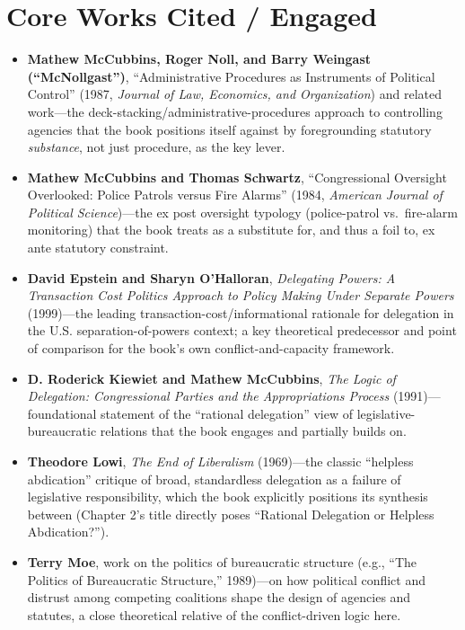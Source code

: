 \documentclass[12pt]{article}
\begin{document}
\section{Core Works Cited / Engaged}

\begin{itemize}[leftmargin=*, itemsep=4pt]
    \item \textbf{Mathew McCubbins, Roger Noll, and Barry Weingast (``McNollgast'')}, ``Administrative Procedures as Instruments of Political Control'' (1987, \textit{Journal of Law, Economics, and Organization}) and related work---the deck-stacking/administrative-procedures approach to controlling agencies that the book positions itself against by foregrounding statutory \emph{substance}, not just procedure, as the key lever.
    \item \textbf{Mathew McCubbins and Thomas Schwartz}, ``Congressional Oversight Overlooked: Police Patrols versus Fire Alarms'' (1984, \textit{American Journal of Political Science})---the ex post oversight typology (police-patrol vs.\ fire-alarm monitoring) that the book treats as a substitute for, and thus a foil to, ex ante statutory constraint.
    \item \textbf{David Epstein and Sharyn O'Halloran}, \textit{Delegating Powers: A Transaction Cost Politics Approach to Policy Making Under Separate Powers} (1999)---the leading transaction-cost/informational rationale for delegation in the U.S. separation-of-powers context; a key theoretical predecessor and point of comparison for the book's own conflict-and-capacity framework.
    \item \textbf{D. Roderick Kiewiet and Mathew McCubbins}, \textit{The Logic of Delegation: Congressional Parties and the Appropriations Process} (1991)---foundational statement of the ``rational delegation'' view of legislative-bureaucratic relations that the book engages and partially builds on.
    \item \textbf{Theodore Lowi}, \textit{The End of Liberalism} (1969)---the classic ``helpless abdication'' critique of broad, standardless delegation as a failure of legislative responsibility, which the book explicitly positions its synthesis between (Chapter 2's title directly poses ``Rational Delegation or Helpless Abdication?'').
    \item \textbf{Terry Moe}, work on the politics of bureaucratic structure (e.g., ``The Politics of Bureaucratic Structure,'' 1989)---on how political conflict and distrust among competing coalitions shape the design of agencies and statutes, a close theoretical relative of the conflict-driven logic here.

\end{itemize}
\end{document}
